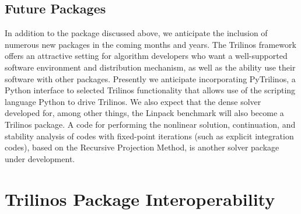 \documentclass[acmtoms,acmnow]{acmtrans2m}
\begin{document}
\subsection{Future Packages}

In addition to the package discussed above, we anticipate the
inclusion of numerous new packages in the coming months and years.
The Trilinos framework offers an attractive setting for algorithm
developers who want a well-supported software environment and
distribution mechanism, as well as the ability use their software with
other packages.  Presently we anticipate incorporating PyTrilinos, a
Python interface to selected Trilinos functionality that allows use of
the scripting language Python to drive Trilinos.  We also expect that
the dense solver developed for, among other things, the Linpack
benchmark will also become a Trilinos package. A code for
performing the nonlinear solution, continuation, and stability 
analysis of codes with fixed-point iterations (such as explicit
integration codes), based on the Recursive Projection Method, is
another solver package under development.

\section{Trilinos Package Interoperability}
\label{sect:Interoperability}
\end{document}
